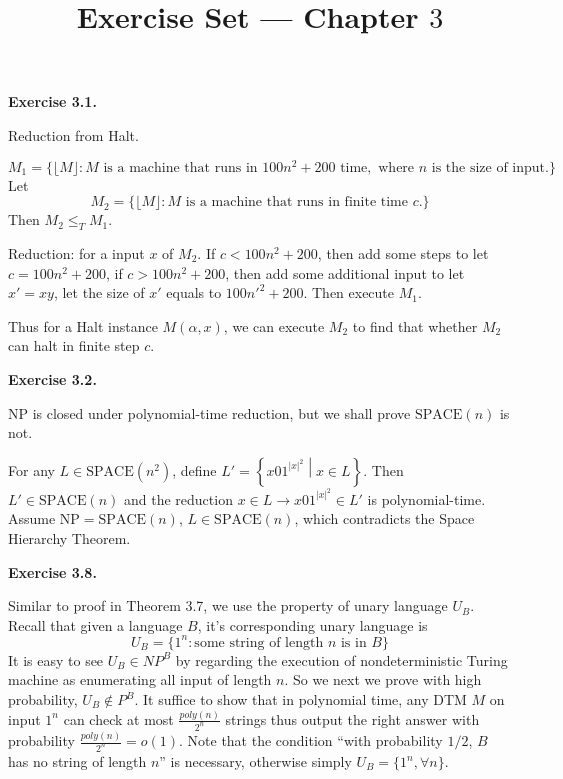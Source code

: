\documentclass[a4paper]{article}
\title{Exercise Set --- Chapter $3$}
\date{}
\newenvironment{exercise}[1]{
	\par
	\noindent\textbf{Exercise #1.}\quad
}{
	\par
	\bigskip
}
\newcommand{\cbra}[1]{\left\{ #1 \right\}}
\begin{document}
\maketitle


\begin{exercise}{3.1}
Reduction from Halt.

$$M_{1}=\{\lfloor M \rfloor : M \text{ is a machine that runs in } 100n^{2} + 200 \text{ time}, \text{ where } n\text{ is the size of input.}\}$$
Let $$M_{2} = \{\lfloor M \rfloor : M \text{ is a machine that runs in finite time }c.\}$$
 Then $M_{2}\leq_{T} M_{1}$.

Reduction: for a input $x$ of $M_{2}$. If $c< 100n^{2} + 200$, then add some steps to let $c = 100n^{2} + 200$, if $c > 100n^{2} + 200$, then add some additional input to let $x'=xy$, let the size of $x'$ equals to $100n'^{2} + 200$. Then execute $M_{1}$. 

Thus for a Halt instance $M(\alpha, x)$, we can execute $M_{2}$ to find that whether $M_{2}$ can halt in finite step $c$.
\end{exercise}


\begin{exercise}{3.2}
    NP is closed under polynomial-time reduction, but we shall prove $\text{SPACE}(n)$ is not.

    For any $L\in\text{SPACE}(n^2)$, define $L'=\cbra{x01^{|x|^2}\middle| x\in L}$.
    Then $L'\in\text{SPACE}(n)$ and the reduction $x\in L\to x01^{|x|^2}\in L'$ is polynomial-time.
    Assume $\text{NP}=\text{SPACE}(n)$, $L\in\text{SPACE}(n)$, which contradicts the Space Hierarchy Theorem.
\end{exercise}

\begin{exercise}{3.8}
    Similar to proof in Theorem 3.7, we use the property of unary language $U_B$. 
    Recall that given a language $B$, it's corresponding unary language is
    $$
    U_B=\{1^n: \text{some string of length $n$ is in $B$}\}
    $$
    It is easy to see $U_B\in NP^B$ by regarding the execution of nondeterministic Turing machine as enumerating all input of length $n$. So we next we prove with high probability, $U_B\not\in P^B$. 
    It suffice to show that in polynomial time, any DTM $M$ on input $1^n$ can check at most $\frac{poly(n)}{2^n}$ strings thus output the right answer with probability $\frac{poly(n)}{2^n}=o(1)$. 
    Note that the condition ``with probability $1/2$, $B$ has no string of length $n$'' is necessary, otherwise simply $U_B=\{1^n, \forall n\}$.

 

\end{exercise}
\end{document}
